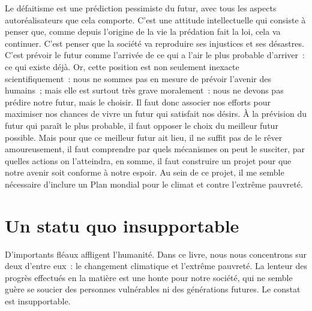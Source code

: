 \documentclass[a5paper,french,openany]{memoir}
\begin{document}
Le défaitisme %
est une prédiction pessimiste du futur, avec tous les aspects autoréalisateurs que cela comporte. C'est une attitude intellectuelle qui consiste à penser que, comme depuis l'origine de la vie la prédation fait la loi, cela va continuer. C'est penser %
que la société va reproduire ses injustices et ses désastres. C'est prévoir le futur comme l'arrivée de ce qui a l'air le plus probable d'arriver~: ce qui existe déjà. Or, cette position est non seulement inexacte scientifiquement~: nous ne sommes pas en mesure de prévoir l'avenir des humains~; mais elle est surtout très grave moralement~: nous ne devons pas prédire notre futur, mais le choisir. %
Il faut donc associer nos efforts pour maximiser nos chances de vivre un futur qui satisfait nos désirs. À la prévision du futur qui paraît le plus probable, il faut opposer le choix du meilleur futur possible. Mais pour que ce meilleur futur ait lieu, il ne suffit pas de le rêver amoureusement, il faut comprendre par quels mécanismes on peut le susciter, par quelles actions on l'atteindra, en somme, il faut construire un projet pour que notre avenir soit conforme à notre espoir.
%
Au sein de ce projet, il me semble nécessaire d'inclure un Plan mondial pour le climat et contre l'extrême pauvreté.


\chapter{Un statu quo insupportable\label{ch:statu_quo}}

D'importants fléaux affligent l'humanité. Dans ce livre, nous nous 
concentrons sur deux d'entre eux~: le changement climatique et l'extrême pauvreté. La lenteur des progrès effectués en la matière est une honte pour notre société, qui ne semble guère se soucier des personnes vulnérables ni des générations futures. Le constat est insupportable.
\end{document}
